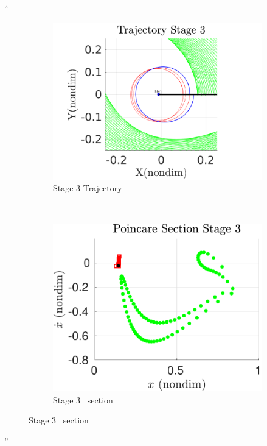 \documentclass[11pt]{article}
\newenvironment{correction}{\begin{list}{}{\setlength{\leftmargin}{1cm}\setlength{\rightmargin}{1cm}}\vspace{\parsep}\item[]``}{''\end{list}}
\begin{document}
\begin{enumerate}
\begin{correction}
\begin{figure}[H]
    \begin{subfigure}[htbp]{0.2\textwidth} 
        \includegraphics[width=\textwidth, keepaspectratio]{figures/geo_transfer/stage3_trajectory_zoom.pdf} 
        \caption{Stage 3 Trajectory} 
    \end{subfigure}~
    \begin{subfigure}[htbp]{0.2\textwidth} 
        \includegraphics[width=\textwidth, keepaspectratio]{figures/geo_transfer/stage3_poincare.pdf} 
        \caption{Stage 3 \Poincare~section } 
    \end{subfigure}
 

\end{figure}
\end{correction}
\end{enumerate}
\end{document}
